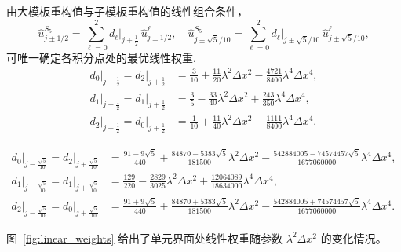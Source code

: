 \documentclass[12pt,a4paper]{article}
\numberwithin{equation}{section}    %
\begin{document}
由大模板重构值与子模板重构值的线性组合条件，
\begin{equation}
        \hat{u}_{j\pm 1/2}^{S_5} = \sum_{\ell=0}^{2} d_\ell\big|_{j+\frac{1}{2}} \,\hat{u}^\ell_{j\pm 1/2},\quad
        \hat{u}_{j\pm \sqrt{5}/10}^{S_5} = \sum_{\ell=0}^{2} d_\ell\big|_{j\pm \sqrt{5}/10} \,\hat{u}^\ell_{j\pm \sqrt{5}/10},
\end{equation}
可唯一确定各积分点处的最优线性权重,
\begin{equation}
    \label{eq:linear_weights_half}
    \begin{aligned}
        d_0\big|_{j-\frac{1}{2}} = d_2\big|_{j+\frac{1}{2}}
        &= \frac{3}{10} + \frac{11}{20}\lambda^2\Delta x^2
          - \frac{4721}{8400}\lambda^4\Delta x^4, \\[4pt]
        d_1\big|_{j-\frac{1}{2}} = d_1\big|_{j+\frac{1}{2}}
        &= \frac{3}{5} - \frac{33}{40}\lambda^2\Delta x^2
          + \frac{243}{350}\lambda^4\Delta x^4, \\[4pt]
        d_2\big|_{j-\frac{1}{2}} = d_0\big|_{j+\frac{1}{2}}
        &= \frac{1}{10} + \frac{11}{40}\lambda^2\Delta x^2
          - \frac{1111}{8400}\lambda^4\Delta x^4.
    \end{aligned}
\end{equation}

\begin{equation}
    \begin{aligned}
        d_0\big|_{j-\frac{\sqrt{5}}{10}} = d_2\big|_{j+\frac{\sqrt{5}}{10}}
        &= \frac{91 - 9\sqrt{5}}{440}
          + \frac{84870 - 5383\sqrt{5}}{181500}\lambda^2\Delta x^2
          - \frac{542884005 - 74574457\sqrt{5}}{1677060000}\lambda^4\Delta x^4, \\[4pt]
        d_1\big|_{j-\frac{\sqrt{5}}{10}} = d_1\big|_{j+\frac{\sqrt{5}}{10}}
        &= \frac{129}{220}
          - \frac{2829}{3025}\lambda^2\Delta x^2
          + \frac{12064089}{18634000}\lambda^4\Delta x^4, \\[4pt]
        d_2\big|_{j-\frac{\sqrt{5}}{10}} = d_0\big|_{j+\frac{\sqrt{5}}{10}}
        &= \frac{91 + 9\sqrt{5}}{440}
          + \frac{84870 + 5383\sqrt{5}}{181500}\lambda^2\Delta x^2
          - \frac{542884005 + 74574457\sqrt{5}}{1677060000}\lambda^4\Delta x^4.
    \end{aligned}
\end{equation}

图~\ref{fig:linear_weights} 给出了单元界面处线性权重随参数 $\lambda^2\Delta x^2$ 的变化情况。
\end{document}
